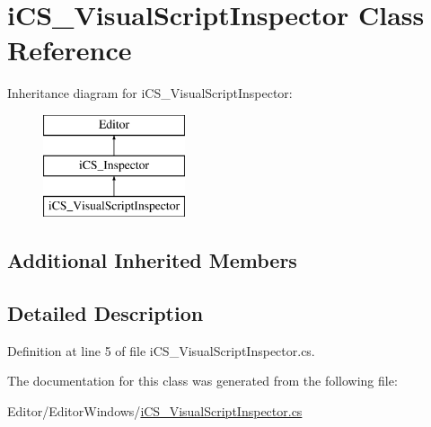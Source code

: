 \hypertarget{classi_c_s___visual_script_inspector}{\section{i\+C\+S\+\_\+\+Visual\+Script\+Inspector Class Reference}
\label{classi_c_s___visual_script_inspector}
}
Inheritance diagram for i\+C\+S\+\_\+\+Visual\+Script\+Inspector\+:\begin{figure}[H]
\begin{center}
\leavevmode
\includegraphics[height=3.000000cm]{classi_c_s___visual_script_inspector}
\end{center}
\end{figure}
\subsection*{Additional Inherited Members}


\subsection{Detailed Description}


Definition at line 5 of file i\+C\+S\+\_\+\+Visual\+Script\+Inspector.\+cs.



The documentation for this class was generated from the following file\+:\begin{DoxyCompactItemize}
\item 
Editor/\+Editor\+Windows/\hyperlink{i_c_s___visual_script_inspector_8cs}{i\+C\+S\+\_\+\+Visual\+Script\+Inspector.\+cs}\end{DoxyCompactItemize}
